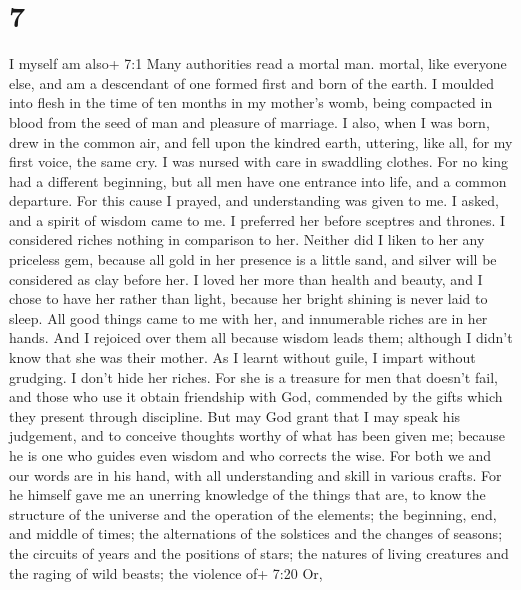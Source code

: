 \hypertarget{section-5}{%
\section{7}\label{section-5}}

 I myself am also+ 7:1 Many authorities read a mortal man.
mortal, like everyone else, and am a descendant of one formed first and
born of the earth.  I moulded into flesh in the time of ten
months in my mother's womb, being compacted in blood from the seed of
man and pleasure of marriage.  I also, when I was born, drew
in the common air, and fell upon the kindred earth, uttering, like all,
for my first voice, the same cry.  I was nursed with care in
swaddling clothes.  For no king had a different beginning,
 but all men have one entrance into life, and a common
departure.  For this cause I prayed, and understanding was
given to me. I asked, and a spirit of wisdom came to me.  I
preferred her before sceptres and thrones. I considered riches nothing
in comparison to her.  Neither did I liken to her any
priceless gem, because all gold in her presence is a little sand, and
silver will be considered as clay before her.  I loved her
more than health and beauty, and I chose to have her rather than light,
because her bright shining is never laid to sleep.  All
good things came to me with her, and innumerable riches are in her
hands.  And I rejoiced over them all because wisdom leads
them; although I didn't know that she was their mother.  As
I learnt without guile, I impart without grudging. I don't hide her
riches.  For she is a treasure for men that doesn't fail,
and those who use it obtain friendship with God, commended by the gifts
which they present through discipline.  But may God grant
that I may speak his judgement, and to conceive thoughts worthy of what
has been given me; because he is one who guides even wisdom and who
corrects the wise.  For both we and our words are in his
hand, with all understanding and skill in various crafts. 
For he himself gave me an unerring knowledge of the things that are, to
know the structure of the universe and the operation of the elements;
 the beginning, end, and middle of times; the alternations
of the solstices and the changes of seasons;  the circuits
of years and the positions of stars;  the natures of living
creatures and the raging of wild beasts; the violence of+ 7:20 Or,
